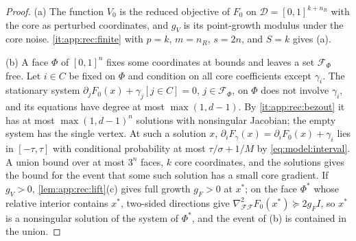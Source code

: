 \begin{proof}
(a) The function $V_0$ is the reduced objective of $F_0$ on
$\mathcal D=[0,1]^{k+n_R}$ with the core as perturbed coordinates, and $g_V$ is
its point-growth modulus under the core noise. \ref{it:app:rec:finite} with
$p=k$, $m=n_R$, $s=2n$, and $S=k$ gives (a).

(b) A face $\Phi$ of $[0,1]^n$ fixes some coordinates at bounds and leaves a set
$\mathcal F_\Phi$ free. Let $i\in C$ be fixed on $\Phi$ and condition on all
core coefficients except $\gamma_i$. The stationary system
$\partial_jF_0(x)+\gamma_j[j\in C]=0$, $j\in\mathcal F_\Phi$, on $\Phi$ does not
involve $\gamma_i$, and its equations have degree at most $\max(1,d-1)$. By
\ref{it:app:rec:bezout} it has at most $\max(1,d-1)^n$ solutions with
nonsingular Jacobian; the empty system has the single vertex. At such a
solution $x$, $\partial_iF_\gamma(x)=\partial_iF_0(x)+\gamma_i$ lies in
$[-\tau,\tau]$ with conditional probability at most $\tau/\sigma+1/M$ by
\eqref{eq:model:interval}. A union bound over at most $3^n$ faces, $k$ core
coordinates, and the solutions gives the bound for the event that some such
solution has a small core gradient. If $g_V>0$, \cref{lem:app:rec:lift}(c)
gives full growth $g_F>0$ at $x^*$; on the face $\Phi^*$ whose relative
interior contains $x^*$, two-sided directions give
$\nabla^2_{\mathcal F\mathcal F}F_0(x^*)\succeq2g_FI$, so $x^*$ is a
nonsingular solution of the system of $\Phi^*$, and the event of (b) is
contained in the union.
\end{proof}

